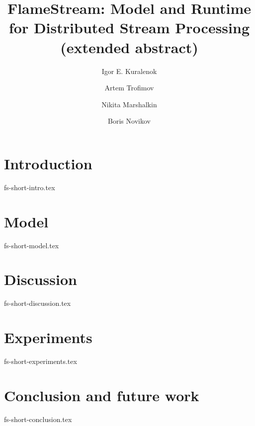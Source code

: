 \documentclass[sigconf]{acmart}
\theoremstyle{remark}
\newcommand {\FlameStream} {FlameStream}
\begin{document}
\title {\FlameStream: Model and Runtime for Distributed Stream Processing (extended abstract)}

\author{Igor E. Kuralenok}

\author{Artem Trofimov}

\author{Nikita Marshalkin}

\author{Boris Novikov}

\begin{abstract}

\end {abstract}

\maketitle

\section {Introduction}
 {fs-short-intro.tex}

\section {Model}
 {fs-short-model.tex}

\section {Discussion}
 {fs-short-discussion.tex}

\section {Experiments}
 {fs-short-experiments.tex}

\section {Conclusion and future work}
 {fs-short-conclusion.tex}



\end{document}
